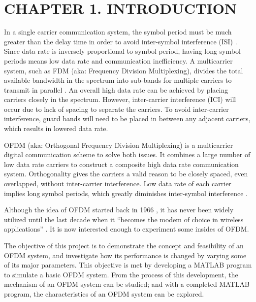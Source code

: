 \section*{CHAPTER 1. INTRODUCTION}
\setcounter{section}{1}
\setcounter{subsection}{0}
\setcounter{figure}{0}
\setcounter{table}{0}

In a single carrier communication system, the symbol period must be much 
greater than the delay time in order to avoid inter-symbol interference (ISI) \cite{b1}. Since 
data rate is inversely proportional to symbol period, having long symbol periods 
means low data rate and communication inefficiency. A multicarrier system, such as 
FDM (aka: Frequency Division Multiplexing), divides the total available bandwidth 
in the spectrum into sub-bands for multiple carriers to transmit in parallel \cite{b2}. An 
overall high data rate can be achieved by placing carriers closely in the spectrum. 
However, inter-carrier interference (ICI) will occur due to lack of spacing to separate 
the carriers. To avoid inter-carrier interference, guard bands will need to be placed in 
between any adjacent carriers, which results in lowered data rate. 

OFDM (aka: Orthogonal Frequency Division Multiplexing) is a multicarrier 
digital communication scheme to solve both issues. It combines a large number of 
low data rate carriers to construct a composite high data rate communication system. 
Orthogonality gives the carriers a valid reason to be closely spaced, even overlapped, 
without inter-carrier interference. Low data rate of each carrier implies long symbol 
periods, which greatly diminishes inter-symbol interference \cite{b3}. 

Although the idea of OFDM started back in 1966 \cite{b4}, it has never been widely 
utilized until the last decade when it “becomes the modem of choice in wireless 
applications” \cite{b5}. It is now interested enough to experiment some insides of OFDM. 

The objective of this project is to demonstrate the concept and feasibility of an 
OFDM system, and investigate how its performance is changed by varying some of 
its major parameters. This objective is met by developing a MATLAB program to 
simulate a basic OFDM system. From the process of this development, the 
mechanism of an OFDM system can be studied; and with a completed MATLAB 
program, the characteristics of an OFDM system can be explored. 

